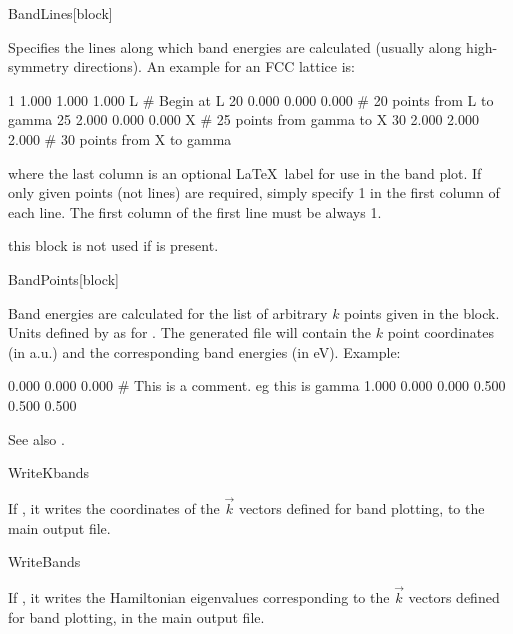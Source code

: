 \begin{fdfentry}{BandLines}[block]

  Specifies the lines along which band energies are calculated
  (usually along high-symmetry directions).  An example for an FCC
  lattice is:
  \begin{fdfexample}
       1  1.000  1.000  1.000  L        # Begin at L
      20  0.000  0.000  0.000  \Gamma   # 20 points from L to gamma
      25  2.000  0.000  0.000  X        # 25 points from gamma to X
      30  2.000  2.000  2.000  \Gamma   # 30 points from X to gamma
  \end{fdfexample}
  where the last column is an optional \LaTeX\ label for use in the
  band plot. If only given points (not lines) are required, simply
  specify 1 in the first column of each line. The first column of the
  first line must be always 1.

  \note this block is not used if  is present.

\end{fdfentry}

\begin{fdfentry}{BandPoints}[block]
  
  Band energies are calculated for the list of arbitrary $k$ points
  given in the block. Units defined by  as for
  . The generated  file will contain the
  $k$ point coordinates (in a.u.) and the corresponding band energies
  (in eV). Example:
  \begin{fdfexample}
        0.000  0.000  0.000   # This is a comment. eg this is gamma
        1.000  0.000  0.000
        0.500  0.500  0.500
  \end{fdfexample}

  See also .
\end{fdfentry}


\begin{fdflogicalF}{WriteKbands}

  If \fdftrue, it writes the coordinates of the $\vec k$ vectors
  defined for band plotting, to the main output file.

\end{fdflogicalF}

\begin{fdflogicalF}{WriteBands}

  If \fdftrue, it writes the Hamiltonian eigenvalues corresponding to
  the $\vec k$ vectors defined for band plotting, in the main output
  file. 

\end{fdflogicalF}


